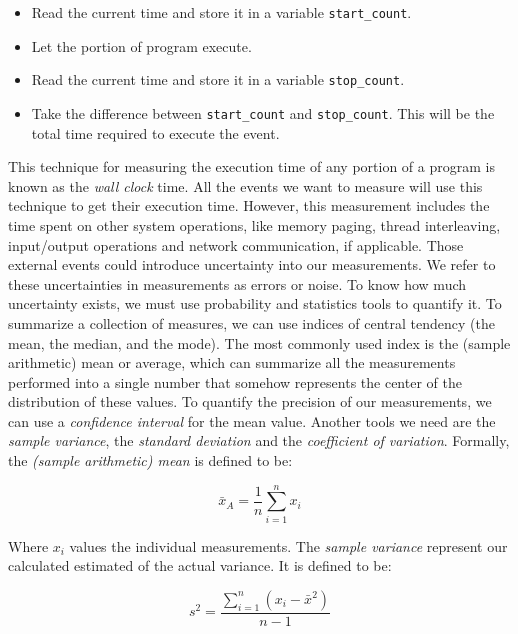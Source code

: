 \documentclass{latex/classes/thesis}
\begin{document}
\begin{itemize}
\item Read the current time and store it in a variable \texttt{start\_count}.
\item Let the portion of program execute.
\item Read the current time and store it in a variable \texttt{stop\_count}.
\item Take the difference between \texttt{start\_count} and \texttt{stop\_count}. This will be the
total time required to execute the event.
\end{itemize}

This technique for measuring the execution time of any portion of a program
is known as the \emph{wall clock} time\cite{lilja2005measuring}. All the events we
want to measure will use this technique to get their execution time.
However, this measurement includes the time spent on other system operations,
like memory paging, thread interleaving, input/output operations and network
communication, if applicable. Those external events could introduce
uncertainty into our measurements. We refer to these uncertainties in
measurements as errors or noise. To know how much uncertainty exists, we must
use probability and statistics tools to quantify it. To summarize a
collection of measures, we can use indices of central tendency (the mean, the
median, and the mode). The most commonly used index is the (sample
arithmetic) mean or average, which can summarize all the measurements
performed into a single number that somehow represents the center of the
distribution of these values. To quantify the precision of our measurements,
we can use a \emph{confidence interval} for the mean
value\cite{lilja2005measuring,DBLP_conf_oopsla_GeorgesBE07}. Another tools we
need are the \emph{sample variance}, the \emph{standard deviation} and the \emph{coefficient of
variation}. Formally, the \emph{(sample arithmetic) mean} is defined to be:

\begin{equation}
\bar{x}_A = \frac{1}{n}\sum^n_{i = 1}x_i
\end{equation}

Where \(x_i\) values the individual measurements. The \emph{sample variance}
represent our calculated estimated of the actual variance. It is defined to
be:

\begin{equation}
s^2 = \frac{\sum_{i = 1}^n(x_i - \bar{x}^2)}{n - 1}
\end{equation}
\end{document}
